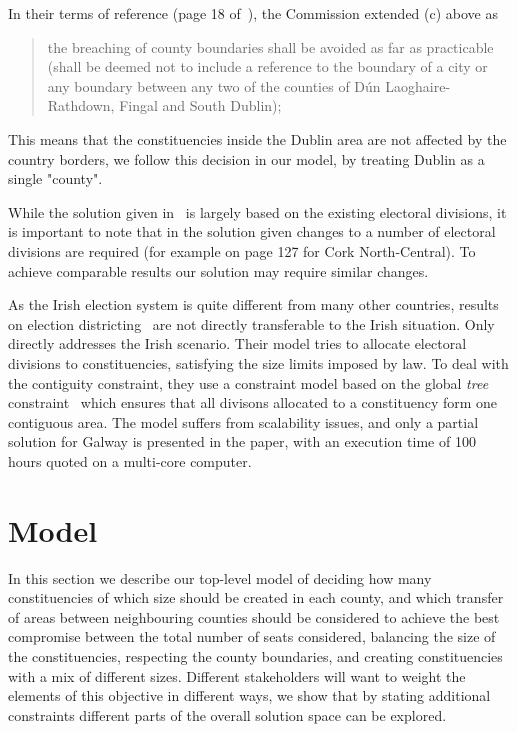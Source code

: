 \documentclass[runningheads]{llncs}
\begin{document}
In their terms of reference (page 18 of~\cite{ElectoralCommission2023}), the Commission extended (c) above as
\begin{quote}
the breaching of county boundaries shall be avoided as far as practicable (shall be deemed not to include a reference to the boundary of a city or any boundary between any two of the counties of Dún Laoghaire-Rathdown, Fingal and South Dublin);
\end{quote}
This means that the constituencies inside the Dublin area are not affected by the country borders, we follow this decision in our model, by treating Dublin as a single "county".  

While the solution given in~\cite{ElectoralCommission2023} is largely based on the existing electoral divisions, it is important to note that in the solution given changes to a number of electoral divisions are required (for example on page 127 for Cork North-Central). To achieve comparable results our solution may require similar changes.

As the Irish election system is quite different from many other countries, results on election districting~\cite{Almeida2022} are not directly transferable to the Irish situation. Only~\cite{Kotthoff2015} directly addresses the Irish scenario. Their model tries to allocate electoral divisions to constituencies, satisfying the size limits imposed by law. To deal with the contiguity constraint, they use a constraint model based on the global \emph{tree} constraint~\cite{Beldiceanu2005} which ensures that all divisons allocated to a constituency form one contiguous area. The model suffers from scalability issues, and only a partial solution for Galway is presented in the paper, with an execution time of 100 hours quoted on a multi-core computer. 



\section{Model}
\label{sec:model}

In this section we describe our top-level model of deciding how many constituencies of which size should be created in each county, and which transfer of areas between neighbouring counties should be considered to achieve the best compromise between the total number of seats considered, balancing the size of the constituencies, respecting the county boundaries, and creating constituencies with a mix of different sizes. Different stakeholders will want to weight the elements of this objective in different ways, we show that by stating additional constraints different parts of the overall solution space can be explored.
\end{document}
